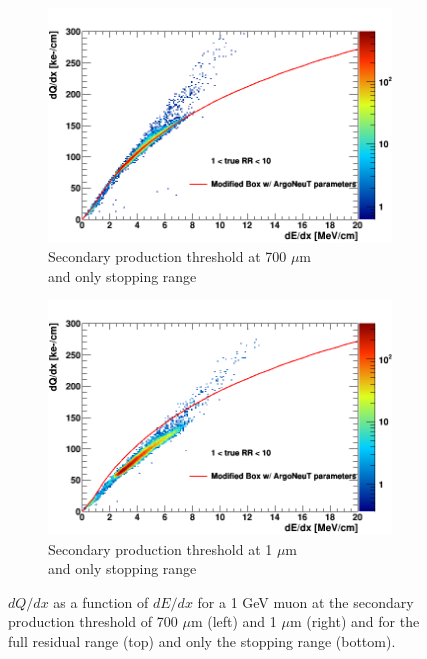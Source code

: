\begin{figure}[hb!]
        \begin{subfigure}[b]{0.495\textwidth}   
            \centering 
            \includegraphics[width=\textwidth]{mu_700um_lowRR}
            \caption{Secondary production threshold at 700 $\mu$m \\and only stopping range}%
            \label{fig:mu_2d_700_lowRR}
        \end{subfigure}
        \hfill
        \begin{subfigure}[b]{0.495\textwidth}   
            \centering 
            \includegraphics[width=\textwidth]{mu_1um_lowRR}
            \caption{Secondary production threshold at 1 $\mu$m \\and only stopping range}%
            \label{fig:mu_2d_1_lowRR}
        \end{subfigure}
	\caption[Energy-Charge Scale of Muons at Different Delta Ray Thresholds]{
        	$dQ/dx$ as a function of $dE/dx$ for a 1 GeV muon at the secondary production threshold of 700 $\mu$m (left) and 1 $\mu$m (right) 
		and for the full residual range (top) and only the stopping range (bottom).
	}
        \label{fig:muon_2d}
\end{figure}
